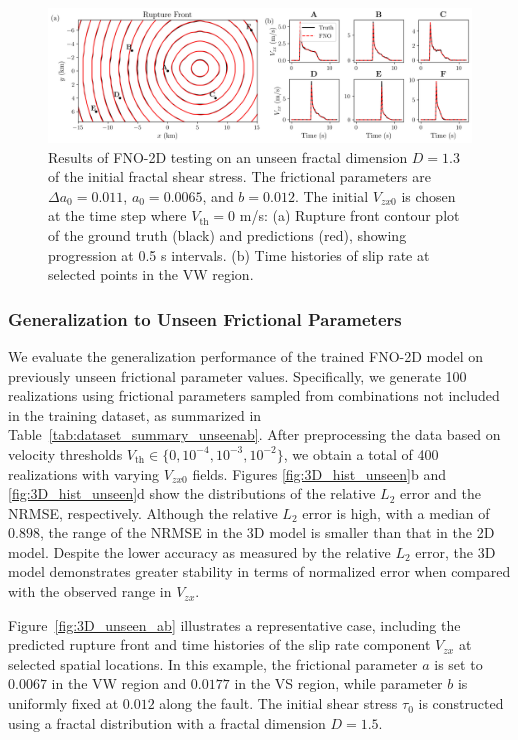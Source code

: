 \documentclass[draft]{agujournal2019}
\begin{document}
\begin{figure}
\centering
\includegraphics[width=1.0\linewidth]{3D_fractal_unseend.png}
\caption{\label{fig:3D_fractal_dim13}Results of FNO-2D testing on an unseen fractal dimension \(D = 1.3\) of the initial fractal shear stress. The frictional parameters are \(\Delta a_{0} = 0.011\), \(a_{0} = 0.0065\), and \(b = 0.012\). The initial \(V_{zx0}\) is chosen at the time step where \(V_\text{th}=0\) m/s: (a) Rupture front contour plot of the ground truth (black) and predictions (red), showing progression at 0.5 s intervals. (b) Time histories of slip rate at selected points in the VW region.
}
\end{figure}

\subsubsection{Generalization to Unseen Frictional Parameters}
\label{sec:FNO-2D_unseen_ab}

We evaluate the generalization performance of the trained FNO-2D model on previously unseen frictional parameter values. Specifically, we generate 100 realizations using frictional parameters sampled from combinations not included in the training dataset, as summarized in Table~\ref{tab:dataset_summary_unseenab}. After preprocessing the data based on velocity thresholds \( V_{\text{th}} \in \{0, 10^{-4}, 10^{-3}, 10^{-2}\} \), we obtain a total of 400 realizations with varying \( V_{zx0} \) fields. Figures \ref{fig:3D_hist_unseen}b and \ref{fig:3D_hist_unseen}d show the distributions of the relative \(L_2\) error and the NRMSE, respectively. Although the relative \(L_2\) error is high, with a median of \(0.898\), the range of the NRMSE in the 3D model is smaller than that in the 2D model. Despite the lower accuracy as measured by the relative \(L_2\) error, the 3D model demonstrates greater stability in terms of normalized error when compared with the observed range in \(V_{zx}\).


Figure~\ref{fig:3D_unseen_ab} illustrates a representative case, including the predicted rupture front and time histories of the slip rate component \( V_{zx} \) at selected spatial locations. In this example, the frictional parameter \( a \) is set to \( 0.0067 \) in the VW region and \( 0.0177 \) in the VS region, while parameter \( b \) is uniformly fixed at \( 0.012 \) along the fault. The initial shear stress \( \tau_{0} \) is constructed using a fractal distribution with a fractal dimension \( D = 1.5 \).
\end{document}
